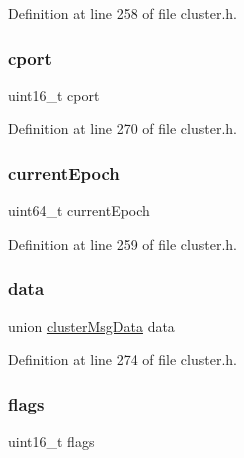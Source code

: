 Definition at line 258 of file cluster.\+h.

\mbox{\label{structcluster_msg_a6adf88a477cb0a9a34317bf4adbca458}} 
\subsubsection{\texorpdfstring{cport}{cport}}
{\footnotesize\ttfamily uint16\+\_\+t cport}



Definition at line 270 of file cluster.\+h.

\mbox{\label{structcluster_msg_a97f41589e815c407f015841f5a3d816f}} 
\subsubsection{\texorpdfstring{current\+Epoch}{currentEpoch}}
{\footnotesize\ttfamily uint64\+\_\+t current\+Epoch}



Definition at line 259 of file cluster.\+h.

\mbox{\label{structcluster_msg_a1baf00312c0917b903606364f0a51211}} 
\subsubsection{\texorpdfstring{data}{data}}
{\footnotesize\ttfamily union \hyperlink{unioncluster_msg_data}{cluster\+Msg\+Data} data}



Definition at line 274 of file cluster.\+h.

\mbox{\label{structcluster_msg_a1e87af3c18a2fd36c61faf89949bdc3f}} 
\subsubsection{\texorpdfstring{flags}{flags}}
{\footnotesize\ttfamily uint16\+\_\+t flags}



